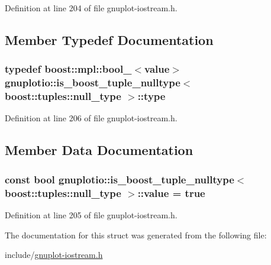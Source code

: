 Definition at line 204 of file gnuplot-\/iostream.\+h.



\subsection{Member Typedef Documentation}
\subsubsection[{\texorpdfstring{type}{type}}]{\setlength{\rightskip}{0pt plus 5cm}typedef boost\+::mpl\+::bool\+\_\+$<${\bf value}$>$ {\bf gnuplotio\+::is\+\_\+boost\+\_\+tuple\+\_\+nulltype}$<$ boost\+::tuples\+::null\+\_\+type $>$\+::{\bf type}}\hypertarget{structgnuplotio_1_1is__boost__tuple__nulltype_3_01boost_1_1tuples_1_1null__type_01_4_aab5c47dbae2148f1e9ed4d89f25f21fd}{}\label{structgnuplotio_1_1is__boost__tuple__nulltype_3_01boost_1_1tuples_1_1null__type_01_4_aab5c47dbae2148f1e9ed4d89f25f21fd}


Definition at line 206 of file gnuplot-\/iostream.\+h.



\subsection{Member Data Documentation}
\subsubsection[{\texorpdfstring{value}{value}}]{\setlength{\rightskip}{0pt plus 5cm}const bool {\bf gnuplotio\+::is\+\_\+boost\+\_\+tuple\+\_\+nulltype}$<$ boost\+::tuples\+::null\+\_\+type $>$\+::value = true\hspace{0.3cm}{\ttfamily [static]}}\hypertarget{structgnuplotio_1_1is__boost__tuple__nulltype_3_01boost_1_1tuples_1_1null__type_01_4_ae7fc5c63a7b01851c7ce12dbf634cfea}{}\label{structgnuplotio_1_1is__boost__tuple__nulltype_3_01boost_1_1tuples_1_1null__type_01_4_ae7fc5c63a7b01851c7ce12dbf634cfea}


Definition at line 205 of file gnuplot-\/iostream.\+h.



The documentation for this struct was generated from the following file\+:\begin{DoxyCompactItemize}
\item 
include/\hyperlink{gnuplot-iostream_8h}{gnuplot-\/iostream.\+h}\end{DoxyCompactItemize}
